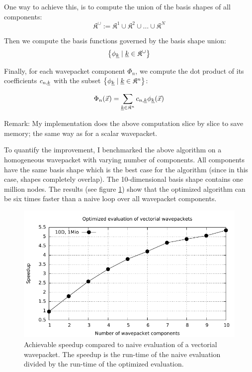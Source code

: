 \documentclass{article}
\begin{document}
One way to achieve this, is to compute the union of the
basis shapes of all components:
\[
\mathfrak{K}^{\cup} := \mathfrak{K}^1 \cup \mathfrak{K}^2 \cup \dots \cup \mathfrak{K}^N
\]

Then we compute the basis functions governed by the basis shape union:
\[
\left\{\phi_{\underline{k}} \;|\;\underline{k} \in \mathfrak{K}^{\cup}\right\}
\]

Finally, for each wavepacket component \(\Phi_n\),
we compute the dot product of its coefficients \(c_{n,\underline{k}}\)
with the subset \(\left\{\phi_{\underline{k}}\;|\; \underline{k} \in \mathfrak{K}^n\right\}\):

\[
\Phi_n(\vec{x})=\sum_{\underline{k} \in \mathfrak{K}^n} c_{n,\underline{k}} \phi_{\underline{k}}(\vec{x})
\]

Remark: My implementation does the above computation slice by slice to save memory;
the same way as for a scalar wavepacket.

To quantify the improvement, I benchmarked the above algorithm on a homogeneous wavepacket with
varying number of components. All components have the same basis shape which is
the best case for the algorithm (since in this case, shapes completely overlap).
The 10-dimensional basis shape contains one million nodes.
The results (see figure \ref{fig:hawp_homogen_evaluation_speedup}) show that the
optimized algorithm can be six times faster than a naive loop over all
wavepacket components.

\begin{figure}[H]
  \centering
  \includegraphics[width=1.0\textwidth]{plots/hawp_eval_homogen_speedup}
  \caption{
    Achievable speedup compared to naive evaluation of a vectorial wavepacket.
    The speedup is the run-time of the naive evaluation divided by the run-time of
    the optimized evaluation.
  }
  \label{fig:hawp_homogen_evaluation_speedup}
\end{figure}
\end{document}

